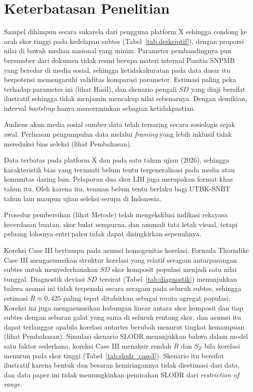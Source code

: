 \section{Keterbatasan Penelitian}

Sampel dihimpun secara sukarela dari pengguna platform X sehingga condong ke arah skor tinggi pada kedelapan subtes (Tabel~\ref{tab:deskriptif}), dengan proporsi nilai di bawah median nasional yang minim. Parameter pembandingnya pun bersumber dari dokumen tidak resmi berupa materi internal Panitia SNPMB yang beredar di media sosial, sehingga ketidakakuratan pada data dasar itu berpotensi memengaruhi validitas komparasi parameter. Estimasi paling peka terhadap parameter ini (lihat Hasil), dan skenario pengali $SD$ yang diuji bersifat ilustratif sehingga tidak menjamin mencakup nilai sebenarnya. Dengan demikian, interval \textit{bootstrap} hanya mencerminkan sebagian ketidakpastian.

Audiens akun media sosial sumber data telah tersaring secara sosiologis sejak awal. Perluasan pengumpulan data melalui \textit{framing} yang lebih inklusif tidak mereduksi bias seleksi (lihat Pembahasan).

Data terbatas pada platform X dan pada satu tahun ujian (2026), sehingga karakteristik bias yang teramati belum tentu tergeneralisasi pada media atau komunitas daring lain. Pelaporan dua skor LBI juga merupakan format khas tahun itu. Oleh karena itu, temuan belum tentu berlaku bagi UTBK-SNBT tahun lain maupun ujian seleksi serupa di Indonesia.

Prosedur pembersihan (lihat Metode) telah mengeksklusi indikasi rekayasa kecerdasan buatan, skor bulat sempurna, dan anomali tata letak visual, tetapi peluang lolosnya entri palsu tidak dapat disingkirkan sepenuhnya.

Koreksi Case III bertumpu pada asumsi homogenitas korelasi. Formula Thorndike Case III mengasumsikan struktur korelasi yang relatif seragam antarpasangan subtes untuk menyederhanakan $SD$ skor komposit populasi menjadi satu nilai tunggal. Diagnostik deviasi $SD$ tersirat (Tabel~\ref{tab:diagnostik}) menunjukkan bahwa asumsi ini tidak terpenuhi secara seragam pada seluruh subtes, sehingga estimasi $\bar{R} \approx 0,425$ paling tepat ditafsirkan sebagai rerata agregat populasi. Koreksi ini juga mengasumsikan hubungan linear antara skor komposit dan tiap subtes dengan sebaran galat yang sama di seluruh rentang skor, dan asumsi itu dapat terlanggar apabila korelasi antartes berubah menurut tingkat kemampuan (lihat Pembahasan). Simulasi skenario SLODR menunjukkan bahwa dalam model satu faktor sederhana, koreksi Case III menaksir rendah $\bar{R}$ dan $S_Z$ bila korelasi menurun pada skor tinggi (Tabel~\ref{tab:slodr_case3}). Skenario itu bersifat ilustratif karena bentuk dan besaran kemiringannya tidak diestimasi dari data, dan data paper ini tidak memungkinkan pemisahan SLODR dari \textit{restriction of range}.

